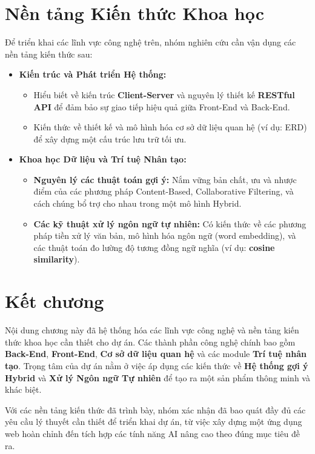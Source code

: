 \section{Nền tảng Kiến thức Khoa học}

Để triển khai các lĩnh vực công nghệ trên, nhóm nghiên cứu cần vận dụng các nền tảng kiến thức sau:

\begin{itemize}
    \item \textbf{Kiến trúc và Phát triển Hệ thống:}
    \begin{itemize}
        \item Hiểu biết về kiến trúc \textbf{Client-Server} và nguyên lý thiết kế \textbf{RESTful API} để đảm bảo sự giao tiếp hiệu quả giữa Front-End và Back-End.
        \item Kiến thức về thiết kế và mô hình hóa cơ sở dữ liệu quan hệ (ví dụ: ERD) để xây dựng một cấu trúc lưu trữ tối ưu.
    \end{itemize}

    \item \textbf{Khoa học Dữ liệu và Trí tuệ Nhân tạo:}
    \begin{itemize}
        \item \textbf{Nguyên lý các thuật toán gợi ý:} Nắm vững bản chất, ưu và nhược điểm của các phương pháp Content-Based, Collaborative Filtering, và cách chúng bổ trợ cho nhau trong một mô hình Hybrid.
        \item \textbf{Các kỹ thuật xử lý ngôn ngữ tự nhiên:} Có kiến thức về các phương pháp tiền xử lý văn bản, mô hình hóa ngôn ngữ (word embedding), và các thuật toán đo lường độ tương đồng ngữ nghĩa (ví dụ: \textbf{cosine similarity}).
    \end{itemize}
\end{itemize}

\section{Kết chương}

Nội dung chương này đã hệ thống hóa các lĩnh vực công nghệ và nền tảng kiến thức khoa học cần thiết cho dự án. Các thành phần công nghệ chính bao gồm \textbf{Back-End}, \textbf{Front-End}, \textbf{Cơ sở dữ liệu quan hệ} và các module \textbf{Trí tuệ nhân tạo}. Trọng tâm của dự án nằm ở việc áp dụng các kiến thức về \textbf{Hệ thống gợi ý Hybrid} và \textbf{Xử lý Ngôn ngữ Tự nhiên} để tạo ra một sản phẩm thông minh và khác biệt.

Với các nền tảng kiến thức đã trình bày, nhóm xác nhận đã bao quát đầy đủ các yêu cầu lý thuyết cần thiết để triển khai dự án, từ việc xây dựng một ứng dụng web hoàn chỉnh đến tích hợp các tính năng AI nâng cao theo đúng mục tiêu đề ra.
